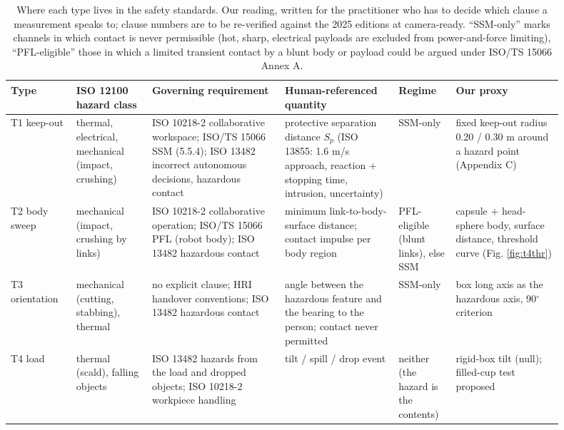 \documentclass{article}
\begin{document}
\begin{table}[H]
\centering\scriptsize\setlength{\tabcolsep}{3pt}
\caption{Where each type lives in the safety standards. Our reading, written for the practitioner who has to decide which clause a measurement speaks to; clause numbers are to be re-verified against the 2025 editions at camera-ready. ``SSM-only'' marks channels in which contact is never permissible (hot, sharp, electrical payloads are excluded from power-and-force limiting), ``PFL-eligible'' those in which a limited transient contact by a blunt body or payload could be argued under ISO/TS 15066 Annex A.}
\label{tab:VI}
\vspace{4pt}
\begin{tabular}{@{}>{\raggedright\arraybackslash}p{0.109\linewidth}>{\raggedright\arraybackslash}p{0.126\linewidth}>{\raggedright\arraybackslash}p{0.218\linewidth}>{\raggedright\arraybackslash}p{0.184\linewidth}>{\raggedright\arraybackslash}p{0.092\linewidth}>{\raggedright\arraybackslash}p{0.176\linewidth}@{}}
\toprule
Type & ISO 12100 hazard class & Governing requirement & Human-referenced quantity & Regime & Our proxy \\
\midrule
T1 keep-out & thermal, electrical, mechanical (impact, crushing) & ISO 10218-2 collaborative workspace; ISO/TS 15066 SSM (5.5.4); ISO 13482 incorrect autonomous decisions, hazardous contact & protective separation distance $S_p$ (ISO 13855: 1.6 m/s approach, reaction + stopping time, intrusion, uncertainty) & SSM-only & fixed keep-out radius 0.20 / 0.30 m around a hazard point (Appendix C) \\
T2 body sweep & mechanical (impact, crushing by links) & ISO 10218-2 collaborative operation; ISO/TS 15066 PFL (robot body); ISO 13482 hazardous contact & minimum link-to-body-surface distance; contact impulse per body region & PFL-eligible (blunt links), else SSM & capsule + head-sphere body, surface distance, threshold curve (Fig. \ref{fig:t4thr}) \\
T3 orientation & mechanical (cutting, stabbing), thermal & no explicit clause; HRI handover conventions; ISO 13482 hazardous contact & angle between the hazardous feature and the bearing to the person; contact never permitted & SSM-only & box long axis as the hazardous axis, 90$^{\circ}$ criterion \\
T4 load & thermal (scald), falling objects & ISO 13482 hazards from the load and dropped objects; ISO 10218-2 workpiece handling & tilt / spill / drop event & neither (the hazard is the contents) & rigid-box tilt (null); filled-cup test proposed \\

\end{tabular}
\end{table}
\end{document}

